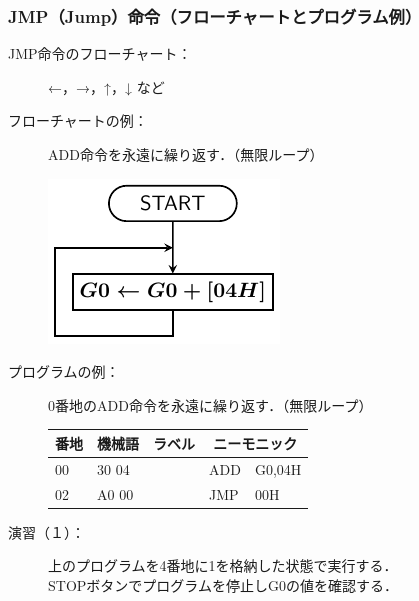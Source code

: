 \documentclass{beamer}                 %
\begin{document}
\begin{frame}
  \frametitle{JMP（Jump）命令（フローチャートとプログラム例）}
  \begin{description}
  \item[JMP命令のフローチャート：]  ←，→，↑，↓ など
    \vfill
    
  \item[フローチャートの例：]ADD命令を永遠に繰り返す．（無限ループ）\\
    \centerline{\includegraphics[scale=0.8]{../Tikz/flow0.pdf}}
    \vfill

  \item[プログラムの例：]0番地のADD命令を永遠に繰り返す．（無限ループ）\\
    {\ttfamily\small\begin{center}
      \begin{tabular}{|l|l|l|l l|} \hline
        番地 & 機械語 & ラベル & \multicolumn{2}{|c|}{ニーモニック} \\
        \hline
        00 & 30 04 & & ADD  & G0,04H \\
        02 & A0 00 & & JMP  & 00H \\
        \hline
      \end{tabular}
    \end{center}}
    \vfill

  \item[演習（１）：]上のプログラムを4番地に1を格納した状態で実行する．\\
    STOPボタンでプログラムを停止しG0の値を確認する．
    \vfill
  \end{description}
\end{frame}
\end{document}
